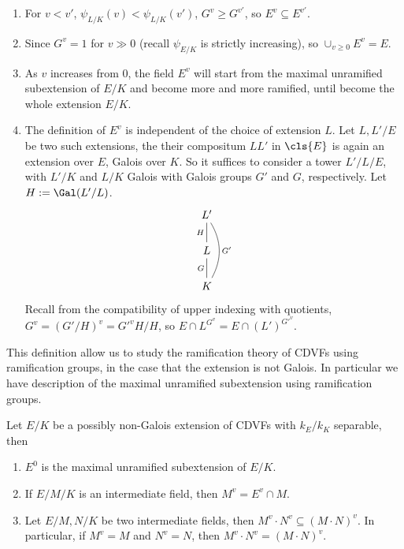 \documentclass[11pt]{amsart}
\begin{document}
\begin{enumerate}
    \item For $v < v'$, $\psi_{L/K}(v) < \psi_{L/K}(v')$, $G^v \geq G^{v'}$, so
        $E^v \subseteq E^{v'}$.
    \item Since $G^v = 1$ for $v \gg 0$ (recall $\psi_{E/K}$ is strictly
        increasing), so $\cup_{v \geq 0} E^v = E$.
    \item As $v$ increases from $0$, the field $E^v$ will start from the maximal
        unramified subextension of $E/K$ and become more and more ramified,
        until become the whole extension $E/K$.
    \item The definition of $E^v$ is independent of the choice of extension
        $L$.  Let $L, L'/E$ be two such extensions, the their compositum $L L'$
        in $\cls{E}$ is again an extension over $E$, Galois over $K$.  So it
        suffices to consider a tower $L' / L / E$, with $L'/K$ and $L/K$ Galois
        with Galois groups $G'$ and $G$, respectively.  Let $H := \Gal(L'/L)$.
        \[
          \begin{tikzcd}
            L' \dar[no head, swap]{H} \ar[no head, bend left]{dd}{G'}\\
            L \dar[no head, swap]{G}\\
            K
          \end{tikzcd}
        \]
        Recall from the compatibility of upper indexing with quotients, $G^v =
        (G'/H)^v = G'^v H / H$, so $E \cap L^{G^v} = E \cap (L')^{G'^v}$.
\end{enumerate}

This definition allow us to study the ramification theory of CDVFs using
ramification groups, in the case that the extension is not Galois.  In
particular we have description of the maximal unramified subextension using
ramification groups.

\begin{prop}
    Let $E/K$ be a possibly non-Galois extension of CDVFs with $k_E/k_K$
    separable, then
    \begin{enumerate}
        \item $E^0$ is the maximal unramified subextension of $E/K$.
        \item If $E/M/K$ is an intermediate field, then $M^v = E^v \cap M$.
        \item Let $E/M, N/K$ be two intermediate fields, then $M^v \cdot N^v
            \subseteq (M \cdot N)^v$.  In particular, if $M^v = M$ and $N^v =
            N$, then $M^v \cdot N^v = (M \cdot N)^v$.
    \end{enumerate}
\end{prop}
\end{document}
